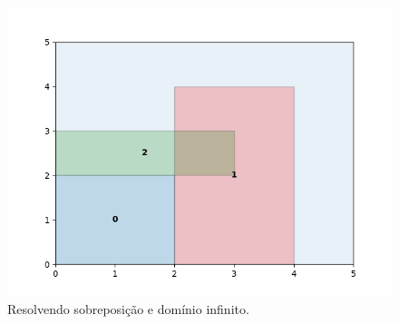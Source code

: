\begin{figure}[H]
    \centering
    \includegraphics[scale=0.5]{utils/images/continuous_example2}
    \caption{Resolvendo sobreposição e domínio infinito.}
    \label{fig:sobreposicao-dominio2}
\end{figure}
